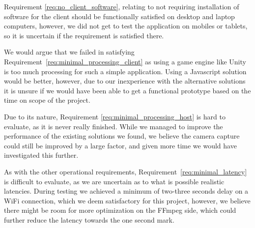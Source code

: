 Requirement \ref{req:no_client_software}, relating to not requiring installation of software for the client should be functionally satisfied on desktop and laptop computers, however, we did not get to test the application on mobiles or tablets, so it is uncertain if the requirement is satisfied there. 

We would argue that we failed in satisfying Requirement~\ref{req:minimal_processing_client} as using a game engine like Unity is too much processing for such a simple application. Using a Javascript solution would be better, however, due to our inexperience with the alternative solutions it is unsure if we would have been able to get a functional prototype based on the time on scope of the project.

Due to its nature, Requirement \ref{req:minimal_processing_host} is hard to evaluate, as it is never really finished. While we managed to improve the performance of the existing solutions we found, we believe the camera capture could still be improved by a large factor, and given more time we would have investigated this further.

As with the other operational requirements, Requirement~\ref{req:minimal_latency} is difficult to evaluate, as we are uncertain as to what is possible realistic latencies. During testing we achieved a minimum of two-three seconds delay on a WiFi connection, which we deem satisfactory for this project, however, we believe there might be room for more optimization on the FFmpeg side, which could further reduce the latency towards the one second mark.






